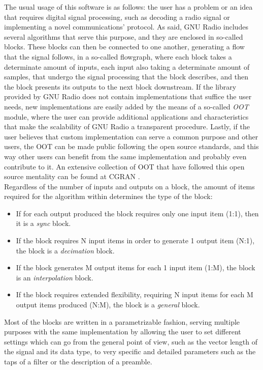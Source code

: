 The usual usage of this software is as follows: the user has a problem or an idea that requires digital signal processing, such as decoding a radio signal or implementing a novel communications' protocol. As said, GNU Radio includes several algorithms that serve this purpose, and they are enclosed in so-called blocks. These blocks can then be connected to one another, generating a flow that the signal follows, in a so-called flowgraph, where each block takes a determinate amount of inputs, each input also taking a determinate amount of samples, that undergo the signal processing that the block describes, and then the block presents its outputs to the next block downstream. If the library provided by GNU Radio does not contain implementations that suffice the user needs, new implementations are easily added by the means of a so-called \emph{\ac{OOT}} module, where the user can provide additional applications and characteristics that make the scalability of GNU Radio a transparent procedure. Lastly, if the user believes that custom implementation can serve a common purpose and other users, the \ac{OOT} can be made public following the open source standards, and this way other users can benefit from the same implementation and probably even contribute to it. An extensive collection of \ac{OOT} that have followed this open source mentality can be found at \ac{CGRAN} \cite{CGRAN}.\\

Regardless of the number of inputs and outputs on a block, the amount of items required for the algorithm within determines the type of the block:

\begin{itemize}
    \item If for each output produced the block requires only one input item (1:1), then it is a \emph{sync} block.
    \item If the block requires N input items in order to generate 1 output item (N:1), the block is a \emph{decimation} block.
    \item If the block generates M output items for each 1 input item (1:M), the block is an \emph{interpolation} block.
    \item If the block requires extended flexibility, requiring N input items for each M output items produced (N:M), the block is a \emph{general} block.
\end{itemize}

Most of the blocks are written in a parametrizable fashion, serving multiple purposes with the same implementation by allowing the user to set different settings which can go from the general point of view, such as the vector length of the signal and its data type, to very specific and detailed parameters such as the taps of a filter or the description of a preamble. \\

